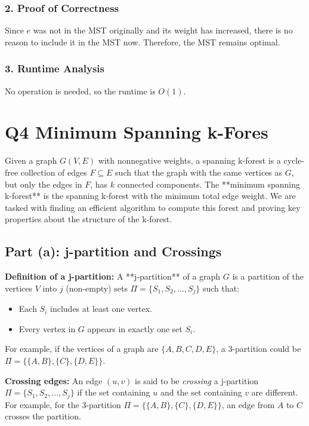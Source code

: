 \documentclass[11pt]{article}
\begin{document}
\subsubsection*{2. Proof of Correctness}
Since \( e \) was not in the MST originally and its weight has increased, there is no reason to include it in the MST now. Therefore, the MST remains optimal.

\subsubsection*{3. Runtime Analysis}
No operation is needed, so the runtime is \( O(1) \).

\newpage





\section*{Q4 Minimum Spanning k-Fores}

Given a graph \( G(V, E) \) with nonnegative weights, a spanning k-forest is a cycle-free collection of edges \( F \subseteq E \) such that the graph with the same vertices as \( G \), but only the edges in \( F \), has \( k \) connected components. The **minimum spanning k-forest** is the spanning k-forest with the minimum total edge weight. We are tasked with finding an efficient algorithm to compute this forest and proving key properties about the structure of the k-forest.

\subsection*{Part (a): j-partition and Crossings}

\textbf{Definition of a j-partition:} 
A **j-partition** of a graph \( G \) is a partition of the vertices \( V \) into \( j \) (non-empty) sets \( \Pi = \{S_1, S_2, \dots, S_j\} \) such that:
\begin{itemize}
    \item Each \( S_i \) includes at least one vertex.
    \item Every vertex in \( G \) appears in exactly one set \( S_i \).
\end{itemize}

For example, if the vertices of a graph are \( \{A, B, C, D, E\} \), a 3-partition could be \( \Pi = \{\{A, B\}, \{C\}, \{D, E\}\} \).

\textbf{Crossing edges:} 
An edge \( (u, v) \) is said to be \emph{crossing} a j-partition \( \Pi = \{S_1, S_2, \dots, S_j\} \) if the set containing \( u \) and the set containing \( v \) are different. For example, for the 3-partition \( \Pi = \{\{A, B\}, \{C\}, \{D, E\}\} \), an edge from \( A \) to \( C \) crosses the partition.
\end{document}

